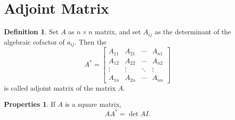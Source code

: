 \documentclass{article}
\theoremstyle{definition}
\newtheorem{defi}{Definition}[section]
\newtheorem{pro}{Properties}[section]
\begin{document}
\section{Adjoint Matrix}
\begin{defi}
    Set $A$ as $n\times n$ matrix, and set $A_{ij}$ as the 
    determinant of the algebraic cofactor of $a_{ij}$. Then the 
    $$
    A^{*}
    =\begin{bmatrix}
        A_{11} & A_{21} & \cdots & A_{n1}\\
        A_{12} & A_{22} & \cdots & A_{n2}\\
        \vdots & \vdots & \ddots & \vdots\\
        A_{1n} & A_{2n} & \cdots & A_{nn}
    \end{bmatrix}
    $$
    is called adjoint matrix of the matrix $A$.
\end{defi}
\begin{pro}
    If $A$ is a square matrix, $$AA^{*}=\det{A}I.$$
\end{pro}
\end{document}
